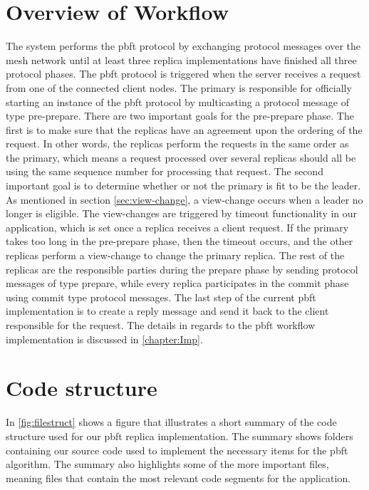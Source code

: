 \section{Overview of Workflow}
The system performs the \ac{pbft} protocol by exchanging protocol messages over the mesh network until at least three replica implementations have finished all three protocol phases. The \ac{pbft} protocol is triggered when the server receives a request from one of the connected client nodes. The primary is responsible for officially starting an instance of the \ac{pbft} protocol by multicasting a protocol message of type pre-prepare. There are two important goals for the pre-prepare phase. The first is to make sure that the replicas have an agreement upon the ordering of the request. In other words, the replicas perform the requests in the same order as the primary, which means a request processed over several replicas should all be using the same sequence number for processing that request. The second important goal is to determine whether or not the primary is fit to be the leader. As mentioned in section \autoref{sec:view-change}, a view-change occurs when a leader no longer is eligible. The view-changes are triggered by timeout functionality in our application, which is set once a replica receives a client request. If the primary takes too long in the pre-prepare phase, then the timeout occurs, and the other replicas perform a view-change to change the primary replica. 
The rest of the replicas are the responsible parties during the prepare phase by sending protocol messages of type prepare, while every replica participates in the commit phase using commit type protocol messages. The last step of the current \ac{pbft} implementation is to create a reply message and send it back to the client responsible for the request. The details in regards to the \ac{pbft} workflow implementation is discussed in \autoref{chapter:Imp}.

\section{Code structure}
In \autoref{fig:filestruct} shows a figure that illustrates a short summary of the code structure used for our \ac{pbft} replica implementation. The summary shows folders containing our source code used to implement the necessary items for the \ac{pbft} algorithm. The summary also highlights some of the more important files, meaning files that contain the most relevant code segments for the application.

